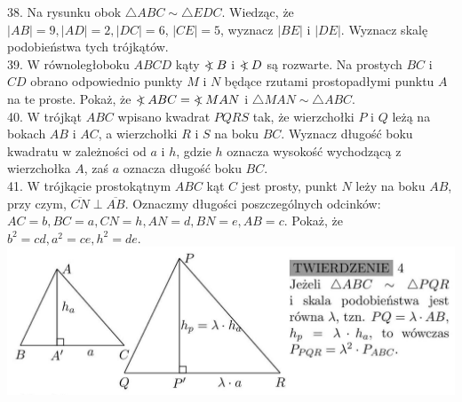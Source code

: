 \documentclass[10pt]{article}
\newcommand\Varangle{\mathop{{<\!\!\!\!\!\text{\small)}}\:}\nolimits}
\begin{document}
38. Na rysunku obok \(\triangle A B C \sim \triangle E D C\). Wiedząc, że \(|A B|=9,|A D|=2,|D C|=6\), \(|C E|=5\), wyznacz \(|B E|\) i \(|D E|\). Wyznacz skalę podobieństwa tych trójkątów.\\
39. W równoległoboku \(A B C D\) kąty \(\Varangle B\) i \(\Varangle D\) są rozwarte. Na prostych \(B C\) i \(C D\) obrano odpowiednio punkty \(M\) i \(N\) będące rzutami prostopadłymi punktu \(A\) na te proste. Pokaż, że \(\Varangle A B C=\Varangle M A N\) i \(\triangle M A N \sim \triangle A B C\).\\
40. W trójkąt \(A B C\) wpisano kwadrat \(P Q R S\) tak, że wierzchołki \(P\) i \(Q\) leżą na bokach \(A B\) i \(A C\), a wierzchołki \(R\) i \(S\) na boku \(B C\). Wyznacz długość boku kwadratu w zależności od \(a\) i \(h\), gdzie \(h\) oznacza wysokość wychodzącą z wierzchołka \(A\), zaś \(a\) oznacza długość boku \(B C\).\\
41. W trójkącie prostokątnym \(A B C\) kąt \(C\) jest prosty, punkt \(N\) leży na boku \(A B\), przy czym, \(\overline{C N} \perp \overline{A B}\). Oznaczmy długości poszczególnych odcinków: \(A C=b, B C=a, C N=h, A N=d, B N=e, A B=c\). Pokaż, że \(b^{2}=c d, a^{2}=c e, h^{2}=d e\).\\
\includegraphics[max width=\textwidth, center]{2024_11_21_e9b4faa005d5be2cc318g-028}
\end{document}
